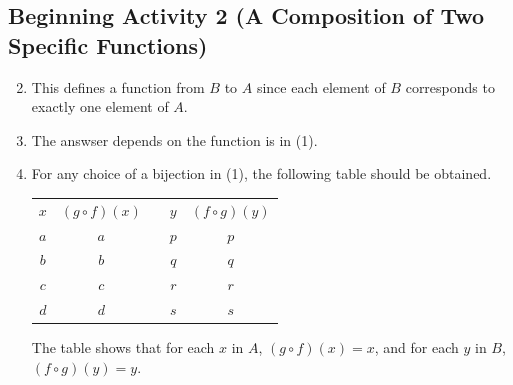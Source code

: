 \documentclass[11pt]{article}
\begin{document}
\subsection*{Beginning Activity 2 (A Composition of Two Specific Functions)}
\begin{enumerate} \setcounter{enumi}{1}
\item This defines a function from  $B$  to  $A$  since each element of  $B$  corresponds to exactly one element of  $A$.

\item  The answser depends on the function is in (1).

\item For any choice of a bijection in (1), the following table should be obtained.

\begin{tabular}[t]{ c | c  c  c | c } 
$x$  &  $\left( {g \circ f} \right)\left( x \right)$  &  &  $y$  &  
$\left( {f \circ g} \right)\left( y \right)$ \\ \cline{1-2} \cline{4-5}
$a$  &  $a$  &  &  $p$  &  $p$  \\ \cline{1-2} \cline{4-5}
$b$  &  $b$  &  &  $q$  &  $q$  \\ \cline{1-2} \cline{4-5}
$c$  &  $c$  &  &  $r$  &  $r$  \\ \cline{1-2} \cline{4-5}
$d$  &  $d$  &  &  $s$  &  $s$  \\ \cline{1-2} \cline{4-5}
\end{tabular}

\newpar
The table shows that for each $x$ in $A$, $\left( {g \circ f} \right)\left( x \right) = x$, and for each 
$y$ in $B$, $\left( {f \circ g} \right)\left( y \right) = y$.

\end{enumerate}
\hbreak
\end{document}
